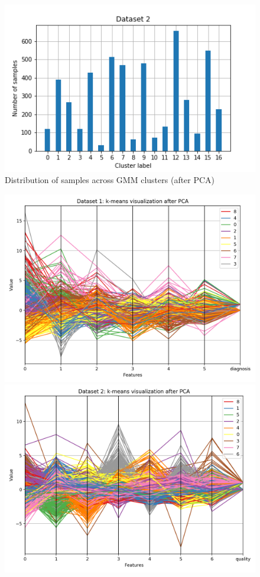 \documentclass[letterpaper]{article}
\begin{document}
\begin{figure}
\begin{minipage}{.48\textwidth}
			\centering
			\includegraphics[width=.5\linewidth]{../../plots/pca_gmm_hist_2}
			\caption{Distribution of samples across GMM clusters (after PCA)}
			\label{fig:pca_gmm_hist}
		\end{minipage}%
	\end{figure}

	\begin{figure}
		\centering
		\begin{minipage}{.5\textwidth}
			\centering
			\includegraphics[width=\linewidth]{../../plots/pca_kmeans_viz_1}
		\end{minipage}%
		\begin{minipage}{.5\textwidth}
			\centering
			\includegraphics[width=\linewidth]{../../plots/pca_kmeans_viz_2}

\end{minipage}
\end{figure}
\end{document}
